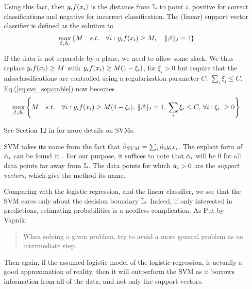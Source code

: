 Using this fact, then $y_i f(x_i)$ is the distance from $\mathbb{L}$ to point $i$, positive for correct classifications and negative for incorrect classification. 
The (linear) support vector classifier is defined as the solution to
\begin{align}
\label{eq:svc_separable}
	\max_{\beta,\beta_0} \left\{  
		M \quad s.t. \quad 
		\forall i: y_i f(x_i) \geq M, \quad \Vert \beta \Vert_2=1
	 \right\}
\end{align}

If the data is not separable by a plane, we need to allow some slack.
We thus replace $y_i f(x_i) \geq M$ with $y_i f(x_i) \geq M(1-\xi_i)$, for $\xi_i>0$ but require that the missclassifications are controlled using a regularization parameter $C$: $\sum_i \xi_i \leq C$.
Eq.(\ref{eq:svc_separable}) now becomes \citep[Eq.(12.25)]{hastie_elements_2003}
\begin{align}
\label{eq:svc_non_separable}
	\max_{\beta,\beta_0} \left\{  
		M \quad s.t. \quad 
		\forall i: y_i f(x_i) \geq M(1-\xi_i), 
		\: \Vert \beta \Vert_2=1, 
		\: \sum_i \xi_i \leq C,
		\:\forall i:\xi_i\ \geq 0
	 \right\}
\end{align}


See Section 12 in \cite{hastie_elements_2003} for more details on SVMs.


\begin{remark}
SVM takes its name from the fact that $\hat{\mathbf{\beta}}_{SVM}=\sum_i \hat{\mathbf{\alpha}}_i y_i x_i$.
The explicit form of $\hat{\mathbf{\alpha}}_i$ can be found in \citep[Section 12.2.1]{hastie_elements_2003}.
For our purpose, it suffices to note that $\hat{\mathbf{\alpha}}_i$ will be $0$ for all data points far away from $\mathbb{L}$.
The data points for which $\hat{\mathbf{\alpha}}_i>0$ are the \emph{support vectors}, which give the method its name.
\end{remark}





\begin{remark}
Comparing with the logistic regression, and the linear classifier, we see that the SVM cares only about the decision boundary $\mathbb{L}$. Indeed, if only interested in predictions, estimating probabilities is a needless complication. As Put by Vapnik: 
\begin{quote}
When solving a given problem, try to avoid a more general problem as an intermediate
step.
\end{quote}
Then again, if the assumed logistic model of the logistic regression, is actually a good approximation of reality, then it will outperform the SVM as it borrows information from all of the data, and not only the support vectors. 
\end{remark}


